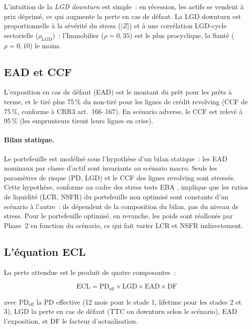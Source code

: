 \documentclass[10pt, a4paper, oneside]{report}
\theoremstyle{definition}
\begin{document}
L'intuition de la \emph{LGD downturn} est simple~: en récession, les actifs se vendent à prix déprimé, ce qui augmente la perte en cas de défaut. La LGD downturn est proportionnelle à la sévérité du stress ($|Z|$) et à une corrélation LGD-cycle sectorielle ($\rho_{\text{LGD}}$)~: l'Immobilier ($\rho = 0{,}35$) est le plus procyclique, la Santé ($\rho = 0{,}10$) le moins.

\subsection{EAD et CCF}

L'exposition en cas de défaut (EAD) est le montant du prêt pour les prêts à terme, et le tiré plus 75\,\% du non-tiré pour les lignes de crédit revolving (CCF de 75\,\%, conforme à CRR3 art.~166--167). En scénario adverse, le CCF est relevé à 95\,\% (les emprunteurs tirent leurs lignes en crise).

\paragraph{Bilan statique.}
Le portefeuille est modélisé sous l'hypothèse d'un bilan statique~: les EAD nominaux par classe d'actif sont invariants au scénario macro. Seuls les paramètres de risque (PD, LGD) et le CCF des lignes revolving sont stressés. Cette hypothèse, conforme au cadre des stress tests EBA \citep{eba_st_2023}, implique que les ratios de liquidité (LCR, NSFR) du portefeuille non optimisé sont constants d'un scénario à l'autre~: ils dépendent de la composition du bilan, pas du niveau de stress. Pour le portefeuille optimisé, en revanche, les poids sont réalloués par Phase~2 en fonction du scénario, ce qui fait varier LCR et NSFR indirectement.

\subsection{L'équation ECL}

La perte attendue est le produit de quatre composantes~:

\begin{equation}
\text{ECL} = \text{PD}_{\text{eff}} \times \text{LGD} \times \text{EAD} \times \text{DF}
\label{eq:ecl}
\end{equation}

\noindent avec $\text{PD}_{\text{eff}}$ la PD effective (12 mois pour le stade 1, lifetime pour les stades 2 et 3), LGD la perte en cas de défaut (TTC ou downturn selon le scénario), EAD l'exposition, et DF le facteur d'actualisation.
\end{document}
